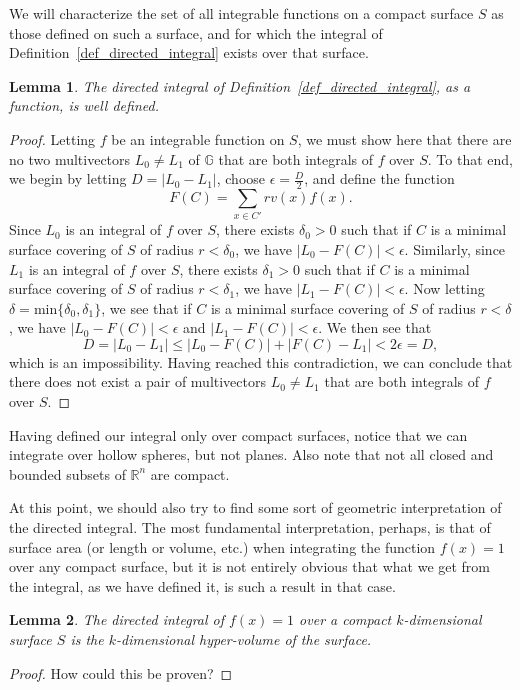 \documentclass[12pt]{article}
\numberwithin{equation}{section}
\newcommand{\G}{\mathbb{G}}
\newcommand{\R}{\mathbb{R}}
\newtheorem{lemma}{Lemma}[section]
\begin{document}
We will characterize the set of all integrable functions on a compact surface $S$ as those defined
on such a surface, and for which
the integral of Definition~\ref{def_directed_integral} exists over that surface.

\begin{lemma}
The directed integral of Definition~\ref{def_directed_integral}, as a function, is well defined.
\end{lemma}
\begin{proof}
Letting $f$ be an integrable function on $S$, we must show here that there
are no two multivectors $L_0\neq L_1$ of $\G$ that are both integrals of $f$ over $S$.
To that end, we begin by letting $D=|L_0-L_1|$, choose $\epsilon = \frac{D}{2}$,
and define the function
\begin{equation*}
F(C) = \sum_{x\in C'}rv(x)f(x).
\end{equation*}
Since $L_0$ is an integral of $f$ over $S$, there exists $\delta_0>0$ such that
if $C$ is a minimal surface covering of $S$ of radius $r<\delta_0$, we have $|L_0-F(C)|<\epsilon$.
Similarly, since $L_1$ is an integral of $f$ over $S$, there exists $\delta_1>0$ such that
if $C$ is a minimal surface covering of $S$ of radius $r<\delta_1$, we have $|L_1-F(C)|<\epsilon$.
Now letting $\delta=\mbox{min}\{\delta_0,\delta_1\}$, we see that if $C$ is a minimal surface
covering of $S$ of radius $r<\delta$, we have $|L_0-F(C)|<\epsilon$ and $|L_1-F(C)|<\epsilon$.
We then see that
\begin{equation*}
D = |L_0-L_1|\leq |L_0-F(C)|+|F(C)-L_1|<2\epsilon = D,
\end{equation*}
which is an impossibility.  Having reached this contradiction, we can conclude that there
does not exist a pair of multivectors $L_0\neq L_1$ that are both integrals of $f$ over $S$.
\end{proof}

Having defined our integral only over compact surfaces, notice that we can
integrate over hollow spheres, but not planes.  Also note that not all closed
and bounded subsets of $\R^n$ are compact.

At this point, we should also try to find some sort of geometric interpretation
of the directed integral.  The most fundamental interpretation, perhaps,
is that of surface area (or length or volume, etc.) when integrating the
function $f(x)=1$ over any compact surface, but it is not entirely obvious
that what we get from the integral, as we have defined it, is such a result
in that case.
\begin{lemma}
The directed integral of $f(x)=1$ over a compact $k$-dimensional surface $S$
is the $k$-dimensional hyper-volume of the surface.
\end{lemma}
\begin{proof}
How could this be proven?
\end{proof}
\end{document}
